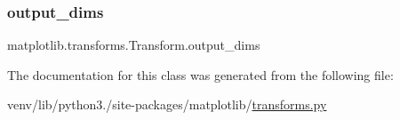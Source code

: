 \mbox{\label{classmatplotlib_1_1transforms_1_1Transform_a54640edfc4c4cec07e567f82a756f767}} 
\subsubsection{\texorpdfstring{output\+\_\+dims}{output\_dims}}
{\footnotesize\ttfamily matplotlib.\+transforms.\+Transform.\+output\+\_\+dims\hspace{0.3cm}{\ttfamily [static]}}



The documentation for this class was generated from the following file\+:\begin{DoxyCompactItemize}
\item 
venv/lib/python3./site-\/packages/matplotlib/\hyperlink{transforms_8py}{transforms.\+py}\end{DoxyCompactItemize}
